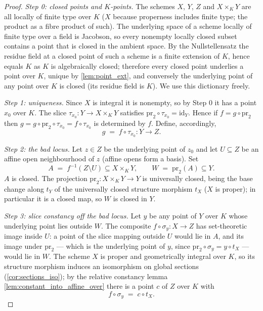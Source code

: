 \begin{proof}
  \leanok
  \emph{Step 0: closed points and \(K\)-points.} The schemes \(X\), \(Y\), \(Z\) and
  \(X \times_K Y\) are all locally of finite type over \(K\) (\(X\) because properness
  includes finite type; the product as a fibre product of such). The underlying space of a
  scheme locally of finite type over a field is Jacobson, so every nonempty locally closed
  subset contains a point that is closed in the ambient space. By the Nullstellensatz the
  residue field at a closed point of such a scheme is a finite extension of \(K\), hence
  equals \(K\) as \(K\) is algebraically closed; therefore every closed point underlies a
  point over \(K\), unique by \ref{lem:point_ext}, and conversely the underlying point of
  any point over \(K\) is closed (its residue field is \(K\)). We use this dictionary
  freely.

  \emph{Step 1: uniqueness.} Since \(X\) is integral it is nonempty, so by Step 0 it has a
  point \(x_0\) over \(K\). The slice \(\tau_{x_0} : Y \to X \times_K Y\) satisfies
  \(\mathrm{pr}_2 \circ \tau_{x_0} = \mathrm{id}_Y\). Hence if \(f = g \circ \mathrm{pr}_2\)
  then \(g = g \circ \mathrm{pr}_2 \circ \tau_{x_0} = f \circ \tau_{x_0}\) is determined by
  \(f\). Define, accordingly,
  \[
    g \;=\; f \circ \tau_{x_0} : Y \longrightarrow Z .
  \]

  \emph{Step 2: the bad locus.} Let \(z \in Z\) be the underlying point of \(z_0\) and let
  \(U \subseteq Z\) be an affine open neighbourhood of \(z\) (affine opens form a basis).
  Set
  \[
    A \;=\; f^{-1}(Z \setminus U) \subseteq X \times_K Y,
    \qquad
    W \;=\; \mathrm{pr}_2(A) \subseteq Y .
  \]
  \(A\) is closed. The projection \(\mathrm{pr}_2 : X \times_K Y \to Y\) is universally
  closed, being the base change along \(t_Y\) of the universally closed structure morphism
  \(t_X\) (\(X\) is proper); in particular it is a closed map, so \(W\) is closed in \(Y\).

  \emph{Step 3: slice constancy off the bad locus.} Let \(y\) be any point of \(Y\) over
  \(K\) whose underlying point lies outside \(W\). The composite
  \(f \circ \sigma_y : X \to Z\) has set-theoretic image inside \(U\): a point of the slice
  mapping outside \(U\) would lie in \(A\), and its image under \(\mathrm{pr}_2\) — which is
  the underlying point of \(y\), since \(\mathrm{pr}_2 \circ \sigma_y = y \circ t_X\) — would
  lie in \(W\). The scheme \(X\) is proper and geometrically integral over \(K\), so its
  structure morphism induces an isomorphism on global sections
  (\ref{cor:sections_iso}); by the relative constancy lemma
  \ref{lem:constant_into_affine_over} there is a point \(c\) of \(Z\) over \(K\) with
  \[
    f \circ \sigma_y \;=\; c \circ t_X .
  \]


\end{proof}
